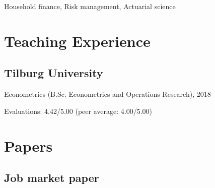\documentclass[12pt,letterpaper]{report}
\newcommand{\listitemspace}{0.15em}
\renewenvironment{itemize}
{\begin{list}{}{\setlength{\leftmargin}{0em}
            \setlength{\parskip}{0em}
            \setlength{\itemsep}{\listitemspace}
            \setlength{\parsep}{\listitemspace}}}
    {\end{list}}
\begin{document}
    \begin{itemize}

        \item Household finance, Risk management, Actuarial science

    \end{itemize}

    \section*{Teaching Experience}

\subsection*{Tilburg University}

\begin{itemize}
	
	\item Econometrics (B.Sc. Econometrics and Operations Research), 2018
	\item Evaluations: 4.42/5.00 (peer average: 4.00/5.00)
	
\end{itemize}




    \section*{Papers}

	\subsection*{Job market paper}
\end{document}
